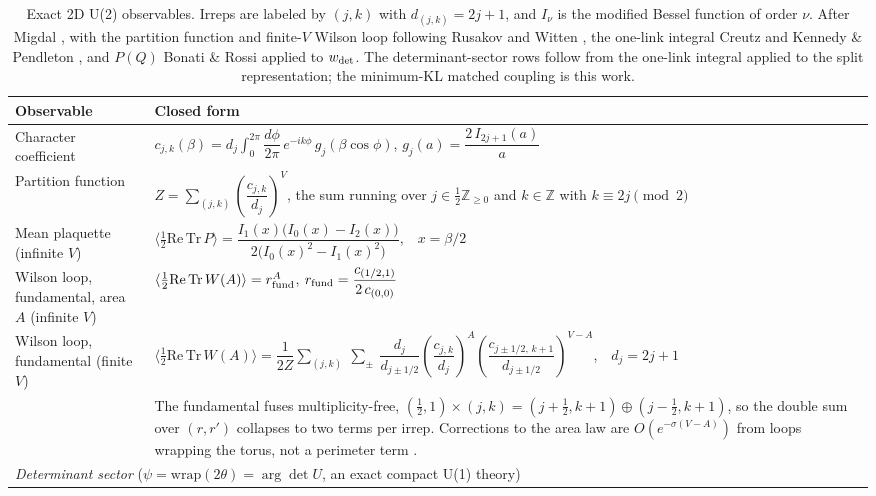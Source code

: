 \documentclass[prd, twocolumn, superscriptaddress, nofootinbib,floatfix]{revtex4-2}
\begin{document}
\begin{table}[htbp]
\centering
\small
\caption{Exact 2D U(2) observables. Irreps are labeled by $(j,k)$ with
$d_{(j,k)}=2j+1$, and $I_\nu$ is the modified Bessel function of order $\nu$.
After Migdal \cite{migdal1975}, with the partition function and finite-$V$
Wilson loop following Rusakov \cite{rusakov1990} and Witten \cite{witten1991},
the one-link integral Creutz \cite{creutz1980} and Kennedy \& Pendleton
\cite{kennedypendleton1985}, and $P(Q)$ Bonati \& Rossi \cite{bonatirossi2019}
applied to $w_{\rm det}$. The determinant-sector rows follow from the one-link
integral applied to the split representation; the minimum-KL matched coupling
is this work.}
\label{tab:u2-exact-observables}
\begin{tabular}{p{4.5cm}p{11.5cm}}
\toprule
Observable & Closed form \\
\midrule
Character coefficient &
  $c_{j,k}(\beta) = d_j \displaystyle\int_0^{2\pi}\dfrac{d\phi}{2\pi}\,e^{-ik\phi}\,g_j(\beta\cos\phi)$,\quad
  $g_j(a) = \dfrac{2\,I_{2j+1}(a)}{a}$ \\
Partition function &
  $Z = \displaystyle\sum_{(j,k)} \left(\dfrac{c_{j,k}}{d_j}\right)^{V}$,\quad
  the sum running over $j\in\tfrac12\mathbb{Z}_{\ge0}$ and $k\in\mathbb{Z}$ with
  $k\equiv 2j \pmod 2$ \\
Mean plaquette (infinite $V$) &
  $\langle\tfrac12\mathrm{Re\,Tr}\,P\rangle = \dfrac{I_1(x)\big(I_0(x)-I_2(x)\big)}{2\big(I_0(x)^2 - I_1(x)^2\big)}$,\ \ $x=\beta/2$ \\
Wilson loop, fundamental, area $A$ (infinite $V$) &
  $\langle\tfrac12\mathrm{Re\,Tr}\,W(A)\rangle = r_{\rm fund}^{A}$,\quad
  $r_{\rm fund} = \dfrac{c_{(1/2,1)}}{2\,c_{(0,0)}}$ \\
Wilson loop, fundamental (finite $V$) &
  $\langle\tfrac12\mathrm{Re\,Tr}\,W(A)\rangle = \dfrac{1}{2Z}\displaystyle\sum_{(j,k)}\ \sum_{\pm}\ \dfrac{d_j}{d_{j\pm1/2}}\left(\dfrac{c_{j,k}}{d_j}\right)^{\!A}\left(\dfrac{c_{j\pm1/2,\,k+1}}{d_{j\pm1/2}}\right)^{\!V-A}$,\ \ $d_j = 2j+1$ \\
& \footnotesize The fundamental fuses multiplicity-free, $(\tfrac12,1)\times(j,k) = (j{+}\tfrac12,k{+}1)\oplus(j{-}\tfrac12,k{+}1)$, so the double sum over $(r,r')$ collapses to two terms per irrep. Corrections to the area law are $O(e^{-\sigma(V-A)})$ from loops wrapping the torus, not a perimeter term \cite{rusakov1990,witten1991}. \\
\midrule
\multicolumn{2}{l}{\textit{Determinant sector} ($\psi=\mathrm{wrap}(2\theta)=\arg\det U$, an exact compact U(1) theory)} \\

\end{tabular}
\end{table}
\end{document}

